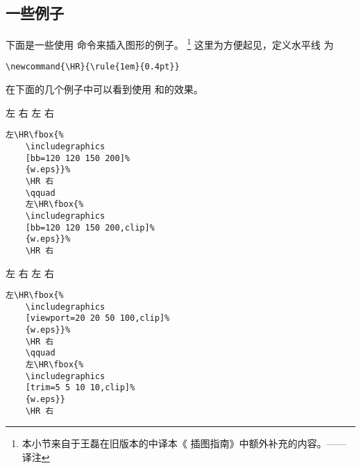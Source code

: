 \subsection{一些例子}

下面是一些使用  命令来插入图形的例子。
\footnote{
	本小节来自于王磊在旧版本的中译本《\LaTeXe{} 插图指南》中额外补充的内容。——译注}
这里为方便起见，定义水平线  为
\begin{lstlisting}
\newcommand{\HR}{\rule{1em}{0.4pt}}
\end{lstlisting}

\ifpdf\else %
在下面的几个例子中可以看到使用 和的效果。

\hspace{-1cm}\begin{minipage}[c]{.5\textwidth}
	左\HR%
	\HR 右
	\qquad
	左\HR%
	\HR 右
\end{minipage}%
\begin{minipage}[c]{.5\textwidth}
	\begin{Verbatim}[frame=lines,label=\colorbox{green}{\small 例一},labelposition=topline,]
	左\HR\fbox{%
	\includegraphics
	[bb=120 120 150 200]%
	{w.eps}}%
	\HR 右
	\qquad
	左\HR\fbox{%
	\includegraphics
	[bb=120 120 150 200,clip]%
	{w.eps}}%
	\HR 右
	\end{Verbatim}
\end{minipage}

\hspace{-1.5cm}\begin{minipage}[c]{.65\textwidth}
	左\HR\fbox{%
		\texttt{[image: w]}}%
	\HR 右
	\qquad
	左\HR\fbox{%
		\texttt{[image: w]}}%
	\HR 右
\end{minipage}%
\hspace{-1cm}\begin{minipage}[c]{.5\textwidth}
	\begin{Verbatim}[frame=lines,label=\colorbox{green}{\small 例二},labelposition=topline]
	左\HR\fbox{%
	\includegraphics
	[viewport=20 20 50 100,clip]%
	{w.eps}}%
	\HR 右
	\qquad
	左\HR\fbox{%
	\includegraphics
	[trim=5 5 10 10,clip]%
	{w.eps}}
	\HR 右
	\end{Verbatim}
	\par\vspace{0pt}
\end{minipage}
\fi

